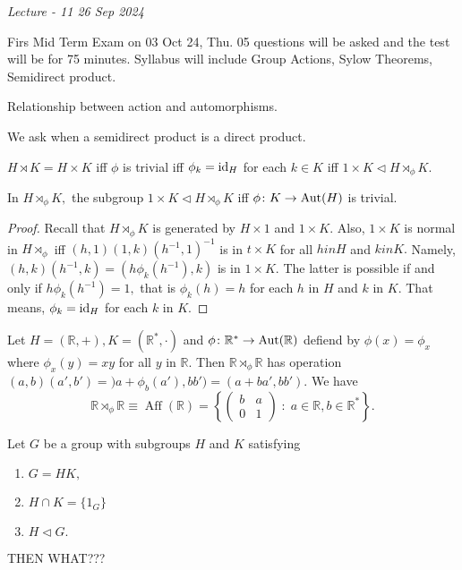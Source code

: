 \noindent\emph{Lecture - 11 \hfill 26 Sep 2024}

Firs Mid Term Exam on 03 Oct 24, Thu.
05 questions will be asked and the test will be for 75 minutes.
Syllabus will include Group Actions, Sylow Theorems, Semidirect product.

Relationship between action and automorphisms.


We ask when a semidirect product is a direct product.

$H \rtimes K = H \times K$ iff
$ \phi $ is trivial iff $ \phi_k = \operatorname{id}_H$ for each $k \in K$
iff $1 \times  K \triangleleft H \rtimes_ \phi K.$


\begin{theorem}
	In $H \rtimes _ \phi K,$ the subgroup $1 \times  K \triangleleft H \rtimes _ \phi K$
	iff $ \phi \colon K \to \operatorname{Aut}(H)$ is trivial.	
\end{theorem}

\begin{proof}
	Recall that $ H \rtimes _ \phi K $ is generated by $H \times  1$ and $ 1 \times  K.$
	Also, $ 1 \times  K$ is normal in $H \rtimes_ \phi$ iff $ (h, 1 ) ( 1,k) ( h^{-1}, 1)^{-1}$ is in $ t \times K$ for all $ h in H$ and $ k in K.$ Namely,
	$(h,k)(h^{-1},k) = (h \phi_k(h^{-1}), k) $ is in $ 1 \times  K.$
	The latter is possible if and only if $ h \phi_k(h^{-1}) = 1,$ that is $\phi_k(h) = h$
	for each $ h$ in $H$ and $k$ in $K.$ That means, $\phi_k = \operatorname{id}_H$ for each $k$ in $K.$
\end{proof}

\begin{example}
	Let $ H = (\mathbb{R}, +), K = (\mathbb{R}^\ast, \cdot)$ and $ \phi \colon \mathbb{R}
	^\ast \to \operatorname{Aut}(\mathbb{R})$ defiend by $ \phi(x) = \phi_x$ where $ \phi_x(y) = xy$
	for all $y$ in $\mathbb{R}.$
	Then $\mathbb{R} \rtimes_ \phi \mathbb{R}$ has operation 
	$(a,b)(a',b') = )a + \phi_b(a'), bb') = (a + ba',bb').$
	We have $$\mathbb{R} \rtimes _\phi \mathbb{R} \equiv \operatorname{Aff}(\mathbb{R})
	 = \left\{ 
	 \begin{pmatrix}
	  b & a \\ 0 & 1 \end{pmatrix} \; : \; a \in \mathbb{R}, b \in \mathbb{R}^\ast 
  \right\} .$$
\end{example}

\begin{theorem}
	Let $G$ be a group with subgroups $H$ and $K$ satisfying 
	\begin{enumerate}
		\item $ G = HK, $ 
		\item $ H \cap K = \{ 1_G \} $ 
		\item $ H \triangleleft G .$ 
	\end{enumerate}
	THEN WHAT???
\end{theorem}


